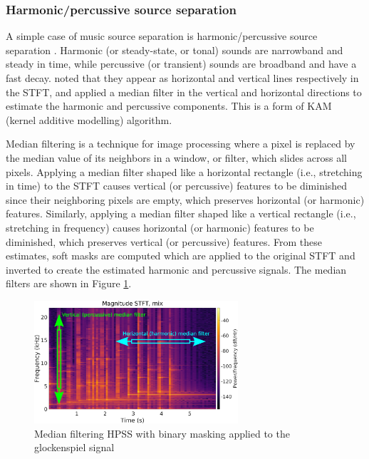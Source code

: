\documentclass[report.tex]{subfiles}
\begin{document}
\subsubsection{Harmonic/percussive source separation}
\label{sec:hpss}

A simple case of music source separation is harmonic/percussive source separation \parencite{musicsepgood}. Harmonic (or steady-state, or tonal) sounds are narrowband and steady in time, while percussive (or transient) sounds are broadband and have a fast decay. \textcite{fitzgerald1} noted that they appear as horizontal and vertical lines respectively in the STFT, and applied a median filter in the vertical and horizontal directions to estimate the harmonic and percussive components. This is a form of KAM (kernel additive modelling) algorithm.

Median filtering is a technique for image processing where a pixel is replaced by the median value of its neighbors in a window, or filter, which slides across all pixels. Applying a median filter shaped like a horizontal rectangle (i.e., stretching in time) to the STFT causes vertical (or percussive) features to be diminished since their neighboring pixels are empty, which preserves horizontal (or harmonic) features. Similarly, applying a median filter shaped like a vertical rectangle (i.e., stretching in frequency) causes horizontal (or harmonic) features to be diminished, which preserves vertical (or percussive) features. From these estimates, soft masks are computed which are applied to the original STFT and inverted to create the estimated harmonic and percussive signals. The median filters are shown in Figure \ref{fig:fitz1}.

\begin{figure}[ht]
	\centering
	\includegraphics[width=0.675\textwidth]{./images-hpss/mix_stft_medianfilters.png}
	\caption{Median filtering HPSS with binary masking applied to the glockenspiel signal}
	\label{fig:fitz1}
\end{figure}
\end{document}
